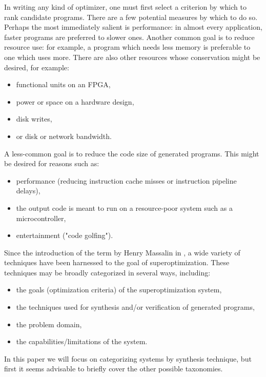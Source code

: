 \documentclass[12pt,twoside]{reedthesis}
\newcommand{\addressed}[2]{{#1}}
\begin{document}
    In writing any kind of optimizer, one must first select a criterion by which to rank candidate programs.
    There are
        \addressed{a few potential measures by which to do so.}{Related to the comment above, these are independent of superoptimization so I would introduce them first in the context of classical optimization}
    Perhaps the most immediately salient is performance:
        in almost every application, faster programs are preferred to slower ones.
    Another common goal is to reduce resource use: 
        for example, a program which needs less memory is \addressed{preferable}{typical practice is to find something to cite for these kinds of claims (maybe just pick some paper that introduce a technique for minimizing memory usage)}
            to one which uses more.
    There are also other resources whose conservation might be desired, for example:
    \begin{itemize}
        \item functional units on an FPGA, \addressed{}{Similarly, citations here would be ideal (but I wouldn't make this a high priority)}
        \item power or space on a hardware design, 
        \item disk writes, 
        \item or disk or network bandwidth.
    \end{itemize}
    A less-common goal is to reduce the code size of generated programs.
    This might be desired for reasons such as:
    \begin{itemize}
            \item performance (reducing instruction cache misses or instruction pipeline delays), 
            \item the output code is meant to run on a resource-poor system such as a microcontroller, 
            \item entertainment ("code golfing").
    \end{itemize}
    
    Since the introduction of the term by Henry Massalin in \cite{massalin1987superoptimizer}, a wide variety of techniques have been harnessed to the goal of superoptimization.
    These techniques may be broadly categorized in several ways, including:
        \begin{itemize}
            \item the goals (optimization criteria) of the superoptimization system,
            \item the techniques used for synthesis and/or verification of generated programs,
            \item the problem domain,
            \item the capabilities/limitations of the system.
        \end{itemize}
    In this paper we will focus on categorizing systems by synthesis technique, but first it seems advisable to briefly cover the other possible taxonomies.
    
\end{document}
